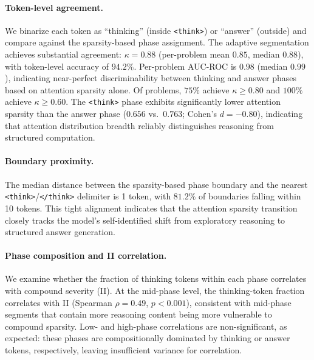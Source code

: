 \paragraph{Token-level agreement.}
We binarize each token as ``thinking'' (inside \texttt{<think>}) or ``answer'' (outside) and compare against the sparsity-based phase assignment. The adaptive segmentation achieves substantial agreement: $\kappa{=}0.88$ (per-problem mean $0.85$, median $0.88$), with token-level accuracy of $94.2\%$. Per-problem AUC-ROC is $0.98$ (median $0.99$), indicating near-perfect discriminability between thinking and answer phases based on attention sparsity alone. Of problems, $75\%$ achieve $\kappa \geq 0.80$ and $100\%$ achieve $\kappa \geq 0.60$. The \texttt{<think>} phase exhibits significantly lower attention sparsity than the answer phase ($0.656$ vs.\ $0.763$; Cohen's $d{=}-0.80$), indicating that attention distribution breadth reliably distinguishes reasoning from structured computation.

\paragraph{Boundary proximity.}
The median distance between the sparsity-based phase boundary and the nearest \texttt{<think>}/\texttt{</think>} delimiter is 1 token, with $81.2\%$ of boundaries falling within 10 tokens. This tight alignment indicates that the attention sparsity transition closely tracks the model's self-identified shift from exploratory reasoning to structured answer generation.

\paragraph{Phase composition and II correlation.}
We examine whether the fraction of thinking tokens within each phase correlates with compound severity (II). At the mid-phase level, the thinking-token fraction correlates with II (Spearman $\rho{=}0.49$, $p < 0.001$), consistent with mid-phase segments that contain more reasoning content being more vulnerable to compound sparsity. Low- and high-phase correlations are non-significant, as expected: these phases are compositionally dominated by thinking or answer tokens, respectively, leaving insufficient variance for correlation.

